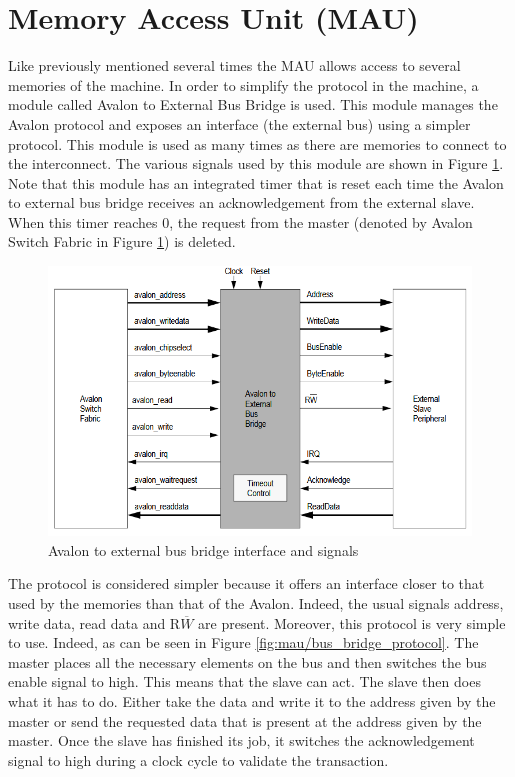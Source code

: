 \section{Memory Access Unit (MAU)}

Like previously mentioned several times the MAU allows access to several memories of the machine. In order 
to simplify the protocol in the machine, a module called Avalon to External Bus Bridge is used. This 
module manages the Avalon protocol and exposes an interface (the external bus) using a simpler 
protocol. This module is used as many times as there are memories to connect to the interconnect.
The various signals used by this module are shown in Figure \ref{fig:mau/bus_bridge}. Note that this
module has an integrated timer that is reset each time the Avalon to external bus bridge receives
an acknowledgement from the external slave. When this timer reaches 0, the request from the master 
(denoted by Avalon Switch Fabric in Figure \ref{fig:mau/bus_bridge}) is deleted.

\begin{figure}[ht!]
    \center
    \includegraphics[scale=0.8]{"Chapter5-MAU_CTRLU/res/external_bus_bridge.PNG"}
    \caption{Avalon to external bus bridge interface and signals}
    \label{fig:mau/bus_bridge}
\end{figure}

The protocol is considered simpler because it offers an interface closer to that used by the memories 
than that of the Avalon.
Indeed, the usual signals address, write data, read data and R$\overline{W}$ are 
present. Moreover, this protocol is very simple to use. Indeed, as can be seen in Figure \ref{fig:mau/bus_bridge_protocol}. The master 
places all the necessary elements on the bus and then switches the bus enable signal to high. This means 
that the slave can act. The slave then does what it has to do. Either take the data and write it to 
the address given by the master or send the requested data that is present at the address given by 
the master. Once the slave has finished its job, it switches the acknowledgement signal to high 
during a clock cycle to validate the transaction. 

